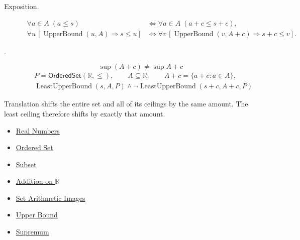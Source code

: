 \begin{remark*}
\begin{description}
  \item[Exposition.]
\[
\begin{aligned}
\forall a\in A\;(a\leq s)
&\Longleftrightarrow
\forall a\in A\;(a+c\leq s+c),\\
\forall u\,[\operatorname{UpperBound}(u,A)\Longrightarrow s\leq u]
&\Longleftrightarrow
\forall v\,[\operatorname{UpperBound}(v,A+c)\Longrightarrow s+c\leq v].
\end{aligned}
\]


  \item[.]
  \[
\sup(A+c)\ne \sup A+c
\]
\[
\begin{aligned}
&P=\mathsf{OrderedSet}(\mathbb{R},\leq),\qquad A\subseteq\mathbb{R},\qquad A+c=\{a+c:a\in A\},\\
&\operatorname{LeastUpperBound}(s,A,P)\land
\neg\operatorname{LeastUpperBound}(s+c,A+c,P)
\end{aligned}
\]
\end{description}
\end{remark*}

\begin{remark*}[Interpretation]
Translation shifts the entire set and all of its ceilings by the same amount. The least ceiling therefore shifts by exactly that amount.
\end{remark*}

\begin{dependencies}
\begin{itemize}
  \item \hyperref[def:reals]{Real Numbers}
  \item \hyperref[def:ordered-set]{Ordered Set}
  \item \hyperref[def:subset]{Subset}
  \item \hyperref[def:addition-on-r]{Addition on $\mathbb{R}$}
  \item \hyperref[def:set-arithmetic-images]{Set Arithmetic Images}
  \item \hyperref[def:real-upper-bound]{Upper Bound}
  \item \hyperref[def:supremum]{Supremum}
\end{itemize}
\end{dependencies}

